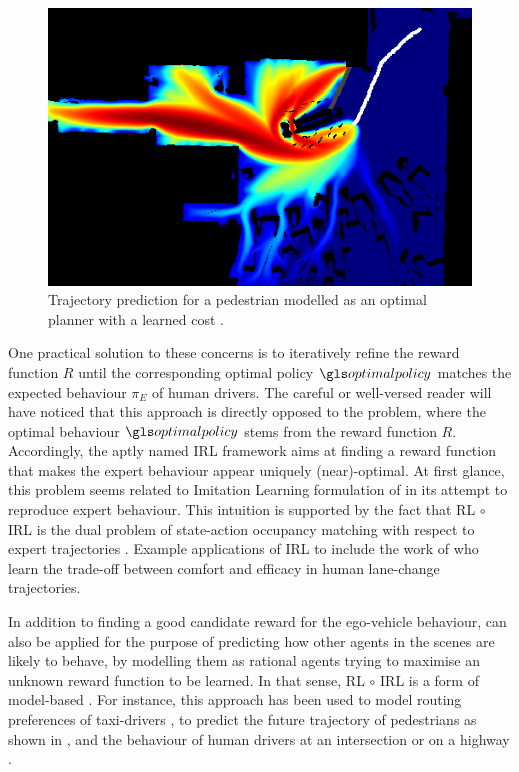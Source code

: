 \begin{figure}[ht]
	\centering
	\includegraphics[width=0.6\linewidth]{img/pedestrian}
	\caption{Trajectory prediction for a pedestrian modelled as an optimal planner with a learned cost \citep{Ziebart2009}.}
	\label{fig:irl-pedestrian}
\end{figure}


One practical solution to these concerns is to iteratively refine the reward function $R$ until the corresponding optimal policy $\optimalpolicy$ matches the expected behaviour $\pi_E$ of human drivers. The careful or well-versed reader will have noticed that this approach is directly opposed to the  problem, where the optimal behaviour $\optimalpolicy$ stems from the reward function $R$. Accordingly, the aptly named \gls{IRL} framework aims at finding a reward function that makes the expert behaviour appear uniquely (near)-optimal. At first glance, this problem seems related to Imitation Learning formulation of  in its attempt to reproduce expert behaviour. This intuition is supported by the fact that \gls{RL} $\circ$ \gls{IRL} is the dual problem of state-action occupancy matching with respect to expert trajectories \citep{Ho2016}. Example applications of \gls{IRL} to  include the work of \citet{Kuderer2015} who learn the trade-off between comfort and efficacy in human lane-change trajectories. 

In addition to finding a good candidate reward for the ego-vehicle behaviour,  can also be applied for the purpose of predicting how other agents in the scenes are likely to behave, by modelling them as rational agents trying to maximise an unknown reward function to be learned. In that sense, \gls{RL} $\circ$ \gls{IRL} is a form of model-based .
For instance, this approach has been used to model routing preferences of taxi-drivers \citep{Ziebart2008}, to predict the future trajectory of pedestrians \citep{Ziebart2009} as shown in , and the behaviour of human drivers at an intersection \citep{Sun2019} or on a highway \citep{Sadigh2016}.


